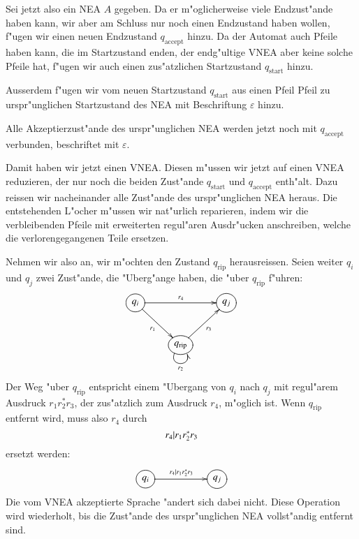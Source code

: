Sei jetzt also ein NEA $A$ gegeben. Da er m"oglicherweise viele
Endzust"ande haben kann, wir aber am Schluss nur noch einen
Endzustand haben wollen, f"ugen wir einen neuen Endzustand
$q_{\text{accept}}$ hinzu.
Da der Automat auch Pfeile haben kann, die im Startzustand enden,
der endg"ultige VNEA aber keine solche Pfeile hat, f"ugen wir
auch einen zus"atzlichen Startzustand $q_{\text{start}}$ hinzu.


Ausserdem f"ugen wir vom neuen Startzustand $q_{\text{start}}$
aus einen Pfeil
Pfeil zu urspr"unglichen Startzustand des NEA mit Beschriftung $\varepsilon$
hinzu.

Alle Akzeptierzust"ande des urspr"unglichen NEA werden jetzt noch mit
$q_{\text{accept}}$ verbunden, beschriftet mit $\varepsilon$.

Damit haben wir jetzt einen VNEA. Diesen
m"ussen wir jetzt auf einen VNEA reduzieren, der nur noch
die beiden Zust"ande $q_{\text{start}}$ und $q_{\text{accept}}$
enth"alt. Dazu reissen wir nacheinander alle Zust"ande des urspr"unglichen
NEA heraus.
Die entstehenden L"ocher 
m"ussen wir nat"urlich reparieren,
indem wir die verbleibenden Pfeile mit erweiterten regul"aren Ausdr"ucken
anschreiben, welche die verlorengegangenen Teile ersetzen.

Nehmen wir also an, wir m"ochten den Zustand $q_ {\text{rip}}$
herausreissen. Seien weiter $q_i$ und $q_j$ zwei Zust"ande, die
"Uberg"ange haben, die "uber $q_{\text{rip}}$ f"uhren:
\[
\entrymodifiers={++[o][F]}
\xymatrix{
{q_i}\ar[rr]^{r_4} \ar[dr]_{r_1}
	&*+\txt{}
		&{q_j}
\\
*+\txt{}
	&{q_{\text{rip}}}\ar[ur]_{r_3} \ar@(dl,dr)_{r_2}
}
\]
Der Weg "uber $q_{\text{rip}}$ entspricht einem "Ubergang
von $q_i$ nach $q_j$ mit regul"arem Ausdruck $r_1r_2^*r_3$,
der zus"atzlich zum Ausdruck $r_4$, m"oglich ist. Wenn $q_{\text{rip}}$
entfernt wird, muss also $r_4$ durch 
\[
r_4{\tt |}r_1r_2^{\tt *}r_3
\]
ersetzt werden:
\[
\entrymodifiers={++[o][F]}
\xymatrix{
{q_i}\ar[rr]^{r_4|r_1r_2^*r_3}
	&*+\txt{}
		&{q_j}
}
\]
Die vom VNEA akzeptierte Sprache "andert sich dabei nicht.
Diese Operation wird wiederholt, bis die Zust"ande des urspr"unglichen
NEA vollst"andig entfernt sind.

